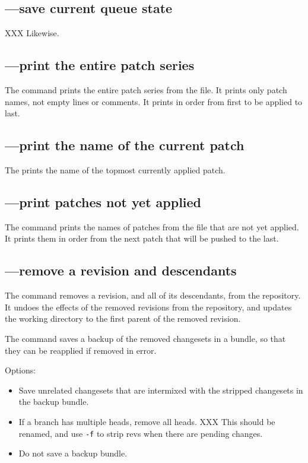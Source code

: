 \subsection{---save current queue state}

XXX Likewise.

\subsection{---print the entire patch series}

The  command prints the entire patch series from the
 file.  It prints only patch names, not empty lines
or comments.  It prints in order from first to be applied to last.

\subsection{---print the name of the current patch}

The  prints the name of the topmost currently applied
patch.

\subsection{---print patches not yet applied}

The  command prints the names of patches from the
 file that are not yet applied.  It prints them in
order from the next patch that will be pushed to the last.

\subsection{---remove a revision and descendants}

The  command removes a revision, and all of its
descendants, from the repository.  It undoes the effects of the
removed revisions from the repository, and updates the working
directory to the first parent of the removed revision.

The  command saves a backup of the removed changesets in
a bundle, so that they can be reapplied if removed in error.

Options:
\begin{itemize}
\item[\hgopt{strip}{-b}] Save unrelated changesets that are intermixed
  with the stripped changesets in the backup bundle.
\item[\hgopt{strip}{-f}] If a branch has multiple heads, remove all
  heads. XXX This should be renamed, and use \texttt{-f} to strip revs
  when there are pending changes.
\item[\hgopt{strip}{-n}] Do not save a backup bundle.
\end{itemize}

